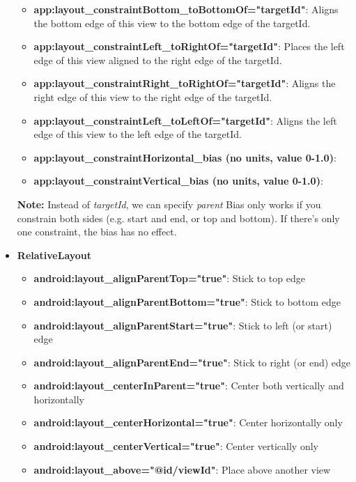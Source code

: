 \documentclass{report}
\begin{document}
\begin{itemize}
\begin{itemize}
                \item \textbf{app:layout\_constraintBottom\_toBottomOf="targetId"}: Aligns the bottom edge of this view to the bottom edge of the targetId.
                \item \textbf{app:layout\_constraintLeft\_toRightOf="targetId"}: Places the left edge of this view aligned to the right edge of the targetId.
                \item \textbf{app:layout\_constraintRight\_toRightOf="targetId"}: Aligns the right edge of this view to the right edge of the targetId.
                \item \textbf{app:layout\_constraintLeft\_toLeftOf="targetId"}: Aligns the left edge of this view to the left edge of the targetId.
                \item \textbf{app:layout\_constraintHorizontal\_bias (no units, value 0-1.0)}:
                \item \textbf{app:layout\_constraintVertical\_bias (no units, value 0-1.0)}:
            \end{itemize}
            \textbf{Note:} Instead of \textit{targetId}, we can specify \textit{parent}
            \bigbreak \noindent 
            Bias only works if you constrain both sides (e.g. start and end, or top and bottom). If there's only one constraint, the bias has no effect.
        \item \textbf{RelativeLayout}
            \begin{itemize}
                \item \textbf{android:layout\_alignParentTop="true"}:	Stick to top edge
                \item \textbf{android:layout\_alignParentBottom="true"}:	Stick to bottom edge
                \item \textbf{android:layout\_alignParentStart="true"}:	Stick to left (or start) edge
                \item \textbf{android:layout\_alignParentEnd="true"}:	Stick to right (or end) edge
                \item \textbf{android:layout\_centerInParent="true"}:	Center both vertically and horizontally
                \item \textbf{android:layout\_centerHorizontal="true"}:	Center horizontally only
                \item \textbf{android:layout\_centerVertical="true"}:	Center vertically only
                \item \textbf{android:layout\_above="@id/viewId"}:	Place above another view

\end{itemize}
\end{itemize}
\end{document}
